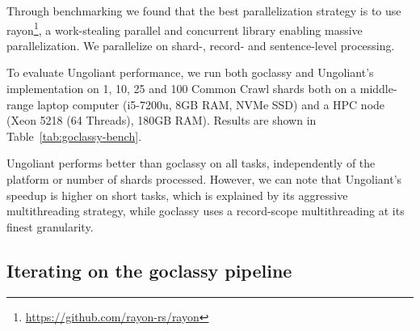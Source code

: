 Through benchmarking we found that the best parallelization strategy is to use rayon\footnote{\url{https://github.com/rayon-rs/rayon}}, a work-stealing \cite{blumofe-etal-1999-scheduling} parallel and concurrent library enabling massive parallelization. We parallelize on \mbox{shard-,} record- and sentence-level processing.

To evaluate Ungoliant performance, we run both goclassy and Ungoliant's implementation on 1, 10, 25 and 100 Common Crawl shards both on a middle-range laptop computer (i5-7200u, 8GB RAM, NVMe SSD) and a HPC node (Xeon 5218 (64 Threads), 180GB RAM). Results are shown in Table~\ref{tab:goclassy-bench}.

\begin{table}[t]
    \centering\small
    \caption{Comparison of approximate generation times depending on platform and number of shards.}
    \label{tab:goclassy-bench}
\end{table}

Ungoliant performs better than goclassy on all tasks, independently of the platform or number of shards processed. However, we can note that Ungoliant's speedup is higher on short tasks, which is explained by its aggressive multithreading strategy, while goclassy uses a record-scope multithreading at its finest granularity.


\subsection{Iterating on the goclassy pipeline}


